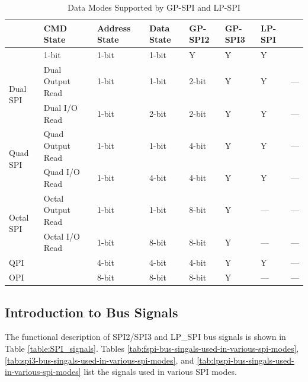 \documentclass[main\_\_EN.tex]{subfiles}
\begin{document}
\begin{longtable}{|l|l|l|l|l|l|l|l|}
\caption{Data Modes Supported by GP-SPI and LP-SPI}
\label{tab:data-modes}\\
\hline
\rowcolor{lightgray}
\multicolumn{2}{|l|}{\textbf{Data Mode}}            & \textbf{CMD State}& \textbf{Address State}& \textbf{Data State}& \textbf{GP-SPI2} & \textbf{GP-SPI3} & \textbf{LP-SPI}\\ \hline
\endfirsthead

    \endlastfoot
\multicolumn{2}{|l|}{1-bit SPI}                       & 1-bit   & 1-bit       & 1-bit    & Y       & Y    & Y     \\ \hline
\multirow{2}{*}{Dual   SPI} & Dual Output Read  & 1-bit   & 1-bit       & 2-bit    & Y       & Y   & ---   \\ \cline{2-8}
                            & Dual I/O Read     & 1-bit   & 2-bit       & 2-bit    & Y       & Y   & ---  \\ \hline
\multirow{2}{*}{Quad SPI}   & Quad Output Read  & 1-bit   & 1-bit       & 4-bit    & Y       & Y   & ---   \\ \cline{2-8}
                            & Quad I/O Read     & 1-bit   & 4-bit       & 4-bit    & Y       & Y   & ---   \\ \hline
\multirow{2}{*}{Octal SPI}  & Octal Output Read & 1-bit   & 1-bit       & 8-bit    & Y       & --- & ---     \\ \cline{2-8}
                            & Octal I/O Read    & 1-bit   & 8-bit       & 8-bit    & Y       & --- & ---     \\ \hline
\multicolumn{2}{|l|}{QPI}                       & 4-bit   & 4-bit       & 4-bit    & Y       & Y   & ---  \\ \hline
\multicolumn{2}{|l|}{OPI}                       & 8-bit   & 8-bit       & 8-bit    & Y       & --- & ---     \\ \hline
\end{longtable}



\subsection{Introduction to Bus Signals}

The functional description of SPI2/SPI3 and LP\_SPI bus signals is shown in Table \ref{table:SPI_signals}. Tables \ref{tab:fspi-bus-singals-used-in-various-spi-modes}, \ref{tab:spi3-bus-singals-used-in-various-spi-modes}, and \ref{tab:lpspi-bus-singals-used-in-various-spi-modes} list the signals used in various SPI modes.
\end{document}

